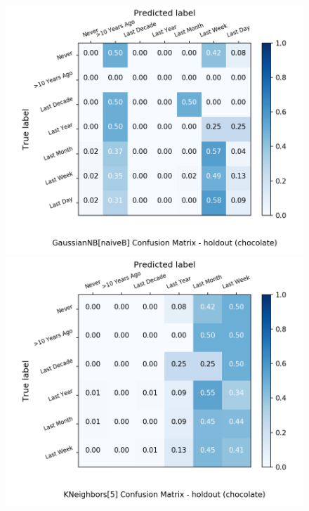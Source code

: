 \begin{figure}[H]
\begin{minipage}[b]{0.32\textwidth}
		\includegraphics[width=1.1\textwidth]{Plots/chocolate_GaussianNB_naiveB_balance_False_holdout.png}
	\end{minipage}
	\begin{minipage}[b]{0.32\textwidth}
		\includegraphics[width=1.1\textwidth]{Plots/chocolate_KNeighbors_5_balance_False_holdout.png}
  \end{minipage}
	\begin{minipage}[b]{0.32\textwidth}

\end{minipage}
\end{figure}
